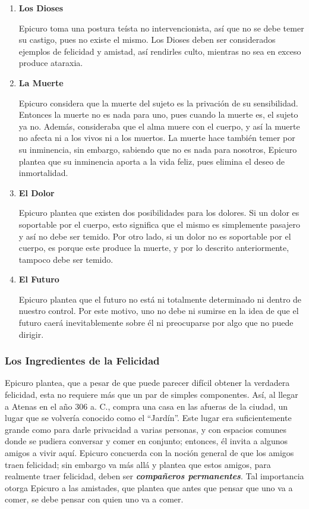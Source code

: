 \documentclass{article}
\begin{document}
\begin{enumerate}
    \item \textbf{Los Dioses}
    
    Epicuro toma una postura teísta no intervencionista, así que no se debe temer su castigo, pues no existe el mismo. Los Dioses deben ser considerados ejemplos de felicidad y amistad, así rendirles culto, mientras no sea en exceso produce ataraxia.

    \item \textbf{La Muerte}
    
    Epicuro considera que la muerte del sujeto es la privación de su sensibilidad. Entonces la muerte no es nada para uno, pues cuando la muerte es, el sujeto ya no. Además, consideraba que el alma muere con el cuerpo, y así la muerte no afecta ni a los vivos ni a los muertos. La muerte hace también temer por su inminencia, sin embargo, sabiendo que no es nada para nosotros, Epicuro plantea que su inminencia aporta a la vida feliz, pues elimina el deseo de inmortalidad.

    \item \textbf{El Dolor}
    
    Epicuro plantea que existen dos posibilidades para los dolores. Si un dolor es soportable por el cuerpo, esto significa que el mismo es simplemente pasajero y así no debe ser temido. Por otro lado, si un dolor no es soportable por el cuerpo, es porque este produce la muerte, y por lo descrito anteriormente, tampoco debe ser temido.

    \item \textbf{El Futuro}
    
    Epicuro plantea que el futuro no está ni totalmente determinado ni dentro de nuestro control. Por este motivo, uno no debe ni sumirse en la idea de que el futuro caerá inevitablemente sobre él ni preocuparse por algo que no puede dirigir.
\end{enumerate}

\subsubsection{Los Ingredientes de la Felicidad}

Epicuro plantea, que a pesar de que puede parecer difícil obtener la verdadera felicidad, esta no requiere más que un par de simples componentes. Así, al llegar a Atenas en el año 306 a. C., compra una casa en las afueras de la ciudad, un lugar que se volvería conocido como el ``Jardín''. Este lugar era suficientemente grande como para darle privacidad a varias personas, y con espacios comunes donde se pudiera conversar y comer en conjunto; entonces, él invita a algunos amigos a vivir aquí. Epicuro concuerda con la noción general de que los amigos traen felicidad; sin embargo va más allá y plantea que estos amigos, para realmente traer felicidad, deben ser \textit{\textbf{compañeros permanentes}}. Tal importancia otorga Epicuro a las amistades, que plantea que antes que pensar que uno va a comer, se debe pensar con quien uno va a comer.
\end{document}
